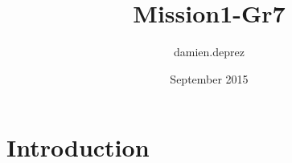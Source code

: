 \documentclass{article}
\title{Mission1-Gr7}
\author{damien.deprez }
\date{September 2015}
\begin{document}
\maketitle

\section{Introduction}
\end{document}
